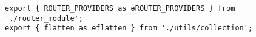 \begin{verbatim}
export { ROUTER_PROVIDERS as ɵROUTER_PROVIDERS } from './router_module';
export { flatten as ɵflatten } from './utils/collection';
\end{verbatim}

